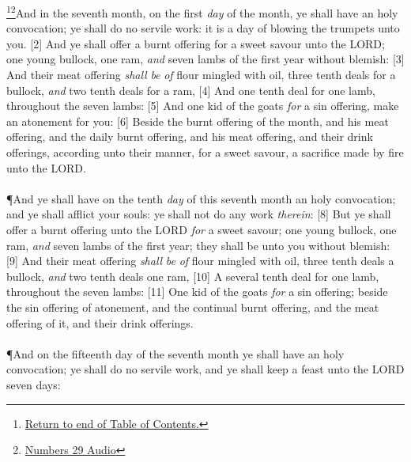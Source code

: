 \footnote{\textcolor[rgb]{0.00,0.25,0.00}{\hyperlink{NumbersTOC}{Return to end of Table of Contents.}}}\footnote{\href{https://audiobible.com/bible/numbers_29.html}{\textcolor[cmyk]{0.99998,1,0,0}{Numbers 29 Audio}}}\textcolor[cmyk]{0.99998,1,0,0}{And in the seventh month, on the first \emph{day} of the month, ye shall have an holy convocation; ye shall do no servile work: it is a day of blowing the trumpets unto you.}
[2] \textcolor[cmyk]{0.99998,1,0,0}{And ye shall offer a burnt offering for a sweet savour unto the LORD; one young bullock, one ram, \emph{and} seven lambs of the first year without blemish:}
[3] \textcolor[cmyk]{0.99998,1,0,0}{And their meat offering \emph{shall} \emph{be} \emph{of} flour mingled with oil, three tenth deals for a bullock, \emph{and} two tenth deals for a ram,}
[4] \textcolor[cmyk]{0.99998,1,0,0}{And one tenth deal for one lamb, throughout the seven lambs:}
[5] \textcolor[cmyk]{0.99998,1,0,0}{And one kid of the goats \emph{for} a sin offering,  make an atonement for you:}
[6] \textcolor[cmyk]{0.99998,1,0,0}{Beside the burnt offering of the month, and his meat offering, and the daily burnt offering, and his meat offering, and their drink offerings, according unto their manner, for a sweet savour, a sacrifice made by fire unto the LORD.}\\
\\
\P \textcolor[cmyk]{0.99998,1,0,0}{And ye shall have on the tenth \emph{day} of this seventh month an holy convocation; and ye shall afflict your souls: ye shall not do any work \emph{therein}:}
[8] \textcolor[cmyk]{0.99998,1,0,0}{But ye shall offer a burnt offering unto the LORD \emph{for} a sweet savour; one young bullock, one ram, \emph{and} seven lambs of the first year; they shall be unto you without blemish:}
[9] \textcolor[cmyk]{0.99998,1,0,0}{And their meat offering \emph{shall} \emph{be} \emph{of} flour mingled with oil, three tenth deals  a bullock, \emph{and} two tenth deals  one ram,}
[10] \textcolor[cmyk]{0.99998,1,0,0}{A several tenth deal for one lamb, throughout the seven lambs:}
[11] \textcolor[cmyk]{0.99998,1,0,0}{One kid of the goats \emph{for} a sin offering; beside the sin offering of atonement, and the continual burnt offering, and the meat offering of it, and their drink offerings.}\\
\\
\P \textcolor[cmyk]{0.99998,1,0,0}{And on the fifteenth day of the seventh month ye shall have an holy convocation; ye shall do no servile work, and ye shall keep a feast unto the LORD seven days:}
